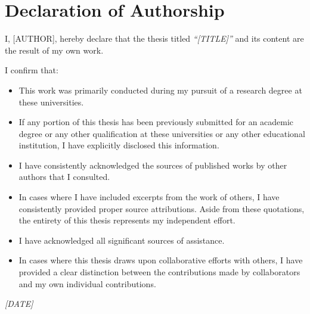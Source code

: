 \chapter*{Declaration of Authorship}

\noindent I, [AUTHOR], hereby declare that the thesis titled \textit{``[TITLE]''} and its content are the result of my own work. 

\noindent I confirm that:

\begin{itemize} 

\item This work was primarily conducted during my pursuit of a research degree at these universities.
\item If any portion of this thesis has been previously submitted for an academic degree or any other qualification at these universities or any other educational institution, I have explicitly disclosed this information.
\item I have consistently acknowledged the sources of published works by other authors that I consulted.
\item In cases where I have included excerpts from the work of others, I have consistently provided proper source attributions. Aside from these quotations, the entirety of this thesis represents my independent effort.
\item I have acknowledged all significant sources of assistance.
\item In cases where this thesis draws upon collaborative efforts with others, I have provided a clear distinction between the contributions made by collaborators and my own individual contributions.
\end{itemize}

\vspace{15pt}
\begin{flushright}
\textit{[DATE]}
\end{flushright}